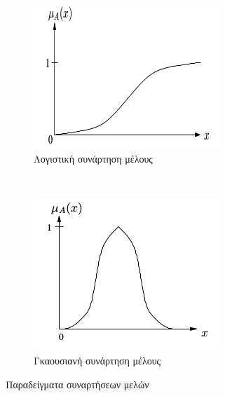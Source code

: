 \documentclass{assignment}
\begin{document}
\begin{figure}[htbp]
\begin{subfigure}[b]{0.5\textwidth}
  \end{subfigure}
   ~ %
  \begin{subfigure}[b]{0.4\textwidth}
    \includegraphics[width=\textwidth,height=0.25\textheight]{images/fuzzy_logic_membership_function_logistic.png}
  \caption{Λογιστική συνάρτηση μέλους}
  \end{subfigure}
   ~ %
  \begin{subfigure}[b]{0.5\textwidth}
    \includegraphics[width=\textwidth,height=0.25\textheight]{images/fuzzy_logic_membership_function_gaussian.png}
  \caption{Γκαουσιανή συνάρτηση μέλους}
  \end{subfigure}
  \caption{Παραδείγματα συναρτήσεων μελών \cite{engelbrecht}}
\label{fig:fuzzy_logic_membership_function}
\end{figure}
\end{document}
